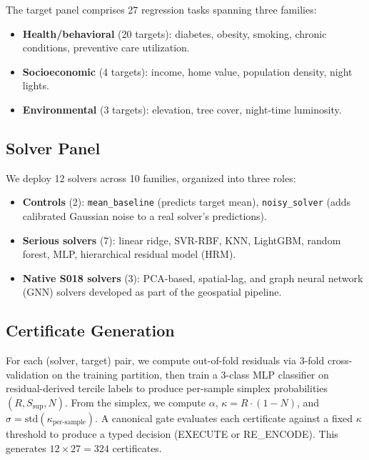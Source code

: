 \documentclass{article}
\begin{document}
The target panel comprises 27 regression tasks spanning three families:
\begin{itemize}
    \item \textbf{Health/behavioral} (20 targets): diabetes, obesity, smoking, chronic conditions, preventive care utilization.
    \item \textbf{Socioeconomic} (4 targets): income, home value, population density, night lights.
    \item \textbf{Environmental} (3 targets): elevation, tree cover, night-time luminosity.
\end{itemize}

\subsection{Solver Panel}

We deploy 12 solvers across 10 families, organized into three roles:

\begin{itemize}
    \item \textbf{Controls} (2): \texttt{mean\_baseline} (predicts target mean), \texttt{noisy\_solver} (adds calibrated Gaussian noise to a real solver's predictions).
    \item \textbf{Serious solvers} (7): linear ridge, SVR-RBF, KNN, LightGBM, random forest, MLP, hierarchical residual model (HRM).
    \item \textbf{Native S018 solvers} (3): PCA-based, spatial-lag, and graph neural network (GNN) solvers developed as part of the geospatial pipeline.
\end{itemize}

\subsection{Certificate Generation}

For each (solver, target) pair, we compute out-of-fold residuals via 3-fold cross-validation on the training partition, then train a 3-class MLP classifier on residual-derived tercile labels to produce per-sample simplex probabilities $(R, S_{\text{sup}}, N)$. From the simplex, we compute $\alpha$, $\kappa = R \cdot (1-N)$, and $\sigma = \text{std}(\kappa_{\text{per-sample}})$. A canonical gate evaluates each certificate against a fixed $\kappa$ threshold to produce a typed decision (EXECUTE or RE\_ENCODE). This generates $12 \times 27 = 324$ certificates.

\end{document}
